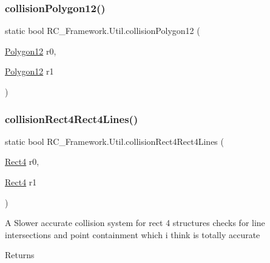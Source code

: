 \subsubsection{\texorpdfstring{collision\+Polygon12()}{collisionPolygon12()}}
{\footnotesize\ttfamily static bool R\+C\+\_\+\+Framework.\+Util.\+collision\+Polygon12 (\begin{DoxyParamCaption}\item[{\mbox{\hyperlink{class_r_c___framework_1_1_polygon12}{Polygon12}}}]{r0,  }\item[{\mbox{\hyperlink{class_r_c___framework_1_1_polygon12}{Polygon12}}}]{r1 }\end{DoxyParamCaption})\hspace{0.3cm}{\ttfamily [static]}}

\mbox{\label{class_r_c___framework_1_1_util_aa5997c26036537e821b8274bbc8348ff}} 
\subsubsection{\texorpdfstring{collision\+Rect4\+Rect4\+Lines()}{collisionRect4Rect4Lines()}}
{\footnotesize\ttfamily static bool R\+C\+\_\+\+Framework.\+Util.\+collision\+Rect4\+Rect4\+Lines (\begin{DoxyParamCaption}\item[{\mbox{\hyperlink{class_r_c___framework_1_1_rect4}{Rect4}}}]{r0,  }\item[{\mbox{\hyperlink{class_r_c___framework_1_1_rect4}{Rect4}}}]{r1 }\end{DoxyParamCaption})\hspace{0.3cm}{\ttfamily [static]}}



A Slower accurate collision system for rect 4 structures checks for line intersections and point containment which i think is totally accurate 

\begin{DoxyReturn}{Returns}

\end{DoxyReturn}
\mbox{\label{class_r_c___framework_1_1_util_a5781bcc8d796c2c8c8f1d52a97aa66b3}} 
